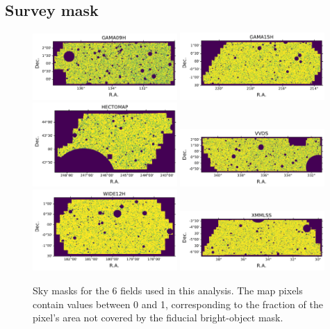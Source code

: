 \documentclass[a4paper,11pt]{article}
\begin{document}
  \subsection{Survey mask}\label{ssec:methods.mask}
    \begin{figure}
      \centering
      \includegraphics[width=0.49\textwidth]{figures/mask_GAMA09H.pdf}
      \includegraphics[width=0.49\textwidth]{figures/mask_GAMA15H.pdf}
      \includegraphics[width=0.49\textwidth]{figures/mask_HECTOMAP.pdf}
      \includegraphics[width=0.49\textwidth]{figures/mask_VVDS.pdf}
      \includegraphics[width=0.49\textwidth]{figures/mask_WIDE12H.pdf}
      \includegraphics[width=0.49\textwidth]{figures/mask_XMMLSS.pdf}
      \caption{Sky masks for the 6 fields used in this analysis. The map pixels contain values between 0 and 1, corresponding to the fraction of the pixel's area not covered by the fiducial bright-object mask.}
      \label{fig:masks}
    \end{figure}
\end{document}
